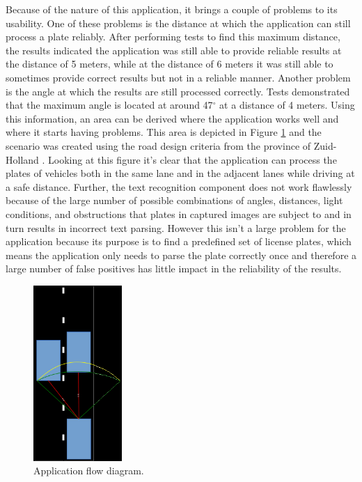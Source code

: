 Because of the nature of this application, it brings a couple of problems to its usability. One of these problems is the distance at which the application can still process a plate reliably. After performing tests to find this maximum distance, the results indicated the application was still able to provide reliable results at the distance of 5 meters, while at the distance of 6 meters it was still able to sometimes provide correct results but not in a reliable manner. Another problem is the angle at which the results are still processed correctly. Tests demonstrated that the maximum angle is located at around 47$^{\circ}$ at a distance of 4 meters. Using this information, an area can be derived where the application works well and where it starts having problems. This area is depicted in Figure \ref{fig:road-situation} and the scenario was created using the road design criteria from the province of Zuid-Holland \cite{road-design}. Looking at this figure it's clear that the application can process the plates of vehicles both in the same lane and in the adjacent lanes while driving at a safe distance. Further, the text recognition component does not work flawlessly because of the large number of possible combinations of angles, distances, light conditions, and obstructions that plates in captured images are subject to and in turn results in incorrect text parsing. However this isn't a large problem for the application because its purpose is to find a predefined set of license plates, which means the application only needs to parse the plate correctly once and therefore a large number of false positives has little impact in the reliability of the results.

\begin{figure}[ht]
    \centering
    \includegraphics[width=0.3\textwidth]{plaatjes/roadeye-road}
    \caption{Application flow diagram.}
    \label{fig:road-situation}
\end{figure}%


